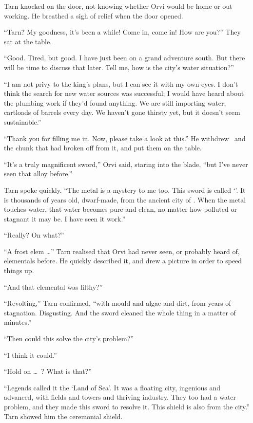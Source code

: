 Tarn knocked on the door, not knowing whether Orvi would be home or out working.  He breathed a sigh of relief when the door opened.

``Tarn?  My goodness, it's been a while!  Come in, come in!  How are you?''  They sat at the table.

``Good.  Tired, but good.  I have just been on a grand adventure south.  But there will be time to discuss that later.  Tell me, how is the city's water situation?''

``I am not privy to the king's plans, but I can see it with my own eyes.  I don't think the search for new water sources was successful; I would have heard about the plumbing work if they'd found anything.  We are still importing water, cartloads of barrels every day.  We haven't gone thirsty yet, but it doesn't seem sustainable.''

``Thank you for filling me in.  Now, please take a look at this.''  He withdrew \kildir\, and the chunk that had broken off from it, and put them on the table.

``It's a truly magnificent sword,'' Orvi said, staring into the blade, ``but I've never seen that alloy before.''

Tarn spoke quickly.  ``The metal is a mystery to me too.  This sword is called `\kildir'.  It is thousands of years old, dwarf-made, from the ancient city of \valdunmir.  When the metal touches water, that water becomes pure and clean, no matter how polluted or stagnant it may be.  I have seen it work.''

``Really?  On what?''

``A frost elem \ldots'' Tarn realised that Orvi had never seen, or probably heard of, elementals before.  He quickly described it, and drew a picture in order to speed things up.

``And that elemental was filthy?''

``Revolting,'' Tarn confirmed, ``with mould and algae and dirt, from years of stagnation.  Disgusting.  And the sword cleaned the whole thing in a matter of minutes.''

``Then could this solve the city's problem?''

``I think it could.''

``Hold on \ldots\ \valdunmir?  What is that?''

``Legends called it the `Land of Sea'.  It was a floating city, ingenious and advanced, with fields and towers and thriving industry.  They too had a water problem, and they made this sword to resolve it.  This shield is also from the city.'' Tarn showed him the ceremonial shield.

